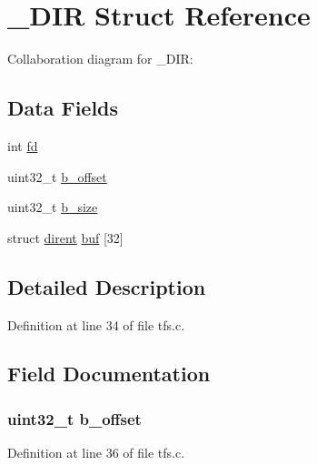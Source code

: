 \hypertarget{struct___d_i_r}{}\section{\+\_\+\+D\+I\+R Struct Reference}
\label{struct___d_i_r}


Collaboration diagram for \+\_\+\+D\+I\+R\+:
\subsection*{Data Fields}
\begin{DoxyCompactItemize}
\item 
int \hyperlink{struct___d_i_r_a6f8059414f0228f0256115e024eeed4b}{fd}
\item 
uint32\+\_\+t \hyperlink{struct___d_i_r_aa7d9e8195489d0093a4a42495e55beec}{b\+\_\+offset}
\item 
uint32\+\_\+t \hyperlink{struct___d_i_r_a74a107b6ecf6720b85be3ab754ebb91d}{b\+\_\+size}
\item 
struct \hyperlink{structdirent}{dirent} \hyperlink{struct___d_i_r_a70aca33069c63d89b270ba5e4cf2e552}{buf} \mbox{[}32\mbox{]}
\end{DoxyCompactItemize}


\subsection{Detailed Description}


Definition at line 34 of file tfs.\+c.



\subsection{Field Documentation}
\hypertarget{struct___d_i_r_aa7d9e8195489d0093a4a42495e55beec}{}
\subsubsection[{b\+\_\+offset}]{\setlength{\rightskip}{0pt plus 5cm}uint32\+\_\+t b\+\_\+offset}\label{struct___d_i_r_aa7d9e8195489d0093a4a42495e55beec}


Definition at line 36 of file tfs.\+c.

\hypertarget{struct___d_i_r_a74a107b6ecf6720b85be3ab754ebb91d}{}
